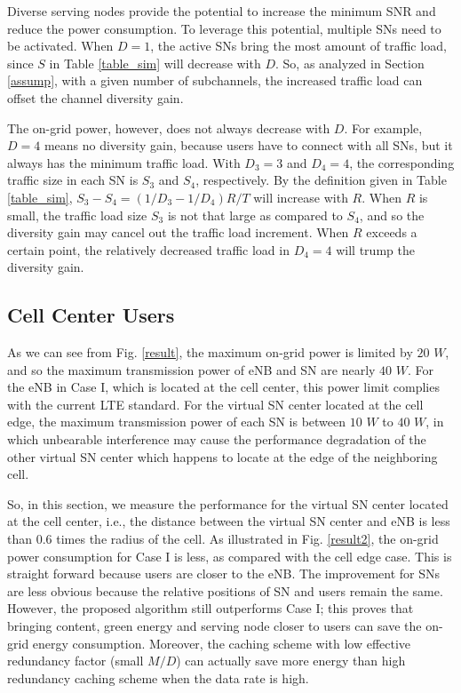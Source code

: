 \documentclass[journal,12pt,onecolumn]{IEEEtran}
\begin{document}
Diverse serving nodes provide the potential to increase the minimum SNR and reduce the power consumption. To leverage this potential, multiple SNs need to be activated. When $D=1$, the active SNs bring the most amount of traffic load, since $S$ in Table \ref{table_sim} will decrease with $D$. So, as analyzed in Section \ref{assump}, with a given number of subchannels, the increased traffic load can offset the channel diversity gain. 

The on-grid power, however, does not always decrease with $D$. For example, $D=4$ means no diversity gain, because users have to connect with all SNs, but it always has the minimum traffic load. With $D_3=3$ and $D_4=4$, the corresponding traffic size in each SN is $S_3$ and $S_4$, respectively. By the definition given in Table \ref{table_sim}, $S_3-S_4=(1/D_3-1/D_4){R}/T$ will increase with $R$. When $R$ is small, the traffic load size $S_3$ is not that large as compared to $S_4$, and so the diversity gain may cancel out the traffic load increment. When $R$ exceeds a certain point, the relatively decreased traffic load in $D_4=4$ will trump the diversity gain.


\subsection{Cell Center Users}
As we can see from Fig. \ref{result}, the maximum on-grid power is limited by $20$ $W$, and so the maximum transmission power of eNB and SN are nearly $40$ $W$. For the eNB in Case I, which is located at the cell center, this power limit complies with the current LTE standard. For the virtual SN center located at the cell edge, the maximum transmission power of each SN is between $10$ $W$ to $40$ $W$, in which unbearable interference may cause the performance degradation of the other virtual SN center which happens to locate at the edge of the neighboring cell. 

So, in this section, we measure the performance for the virtual SN center located at the cell center, i.e., the distance between the virtual SN center and eNB is less than $0.6$ times the radius of the cell. As illustrated in Fig. \ref{result2}, the on-grid power consumption for Case I is less, as compared with the cell edge case. This is straight forward because users are closer to the eNB. The improvement for SNs are less obvious because the relative positions of SN and users remain the same. However, the proposed algorithm still outperforms Case I; this proves that bringing content, green energy and serving node closer to users can save the on-grid energy consumption. Moreover, the caching scheme with low effective redundancy factor (small $M/D$) can actually save more energy than high redundancy caching scheme when the data rate is high.
\end{document}
